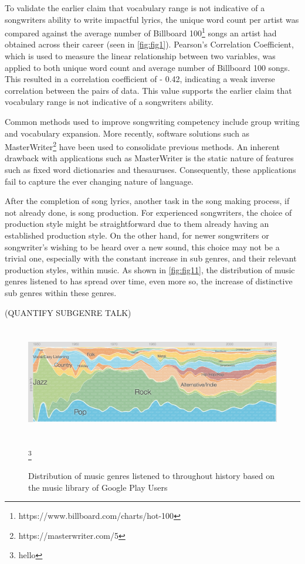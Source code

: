 \noindent
\newline
To validate the earlier claim that vocabulary range is not indicative of a songwriters ability to write impactful lyrics, the unique word count per artist was compared against the average number of Billboard 100\footnote{https://www.billboard.com/charts/hot-100} songs an artist had obtained across their career (seen in \autoref{fig:fig1}). Pearson's Correlation Coefficient, which is used to measure the linear relationship between two variables, was applied to both unique word count and average number of Billboard 100 songs. This resulted in a correlation coefficient of - 0.42, indicating a weak inverse correlation between the pairs of data. This value supports the earlier claim that vocabulary range is not indicative of a songwriters ability.

\noindent
\newline
Common methods used to improve songwriting competency include group writing and vocabulary expansion. More recently, software solutions such as MasterWriter\footnote{https://masterwriter.com/5} have been used to consolidate previous methods. An inherent drawback with applications such as MasterWriter is the static nature of features such as fixed word dictionaries and thesauruses. Consequently, these applications fail to capture the ever changing nature of language.

\noindent
\newline
After the completion of song lyrics, another task in the song making process, if not already done, is song production. For experienced songwriters, the choice of production style might be straightforward due to them already having an established production style. On the other hand, for newer songwriters or songwriter's wishing to be heard over a new sound, this choice may not be a trivial one, especially with the constant increase in sub genres, and their relevant production styles, within music. As shown in \autoref{fig:fig11}, the distribution of music genres listened to has spread over time, even more so, the increase of distinctive sub genres within these genres.

\noindent
\newline
(QUANTIFY SUBGENRE TALK)
\begin{figure}[h]	
	\includegraphics[width=14cm, height=5cm]{./figures/fig11}
	\centering
	\caption[Distribution of Music Genres throughout History]{Distribution of music genres listened to throughout history based on the music library of Google Play Users}
	\footnote{hello}
	\label{fig:fig11}
\end{figure}

